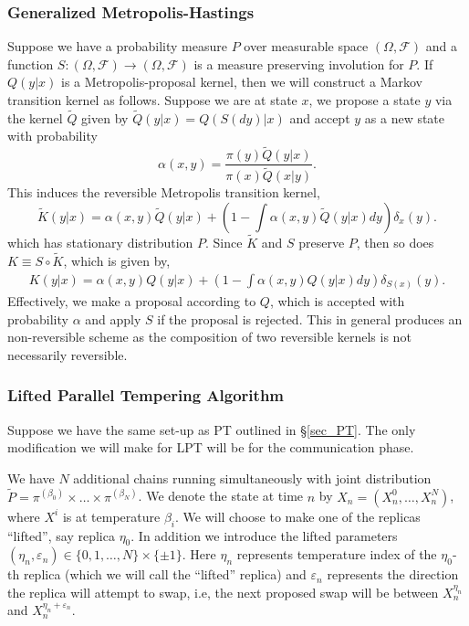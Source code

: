 \documentclass[12pt]{article}
\newcommand{\eps}{\varepsilon}
\begin{document}
\subsubsection{Generalized Metropolis-Hastings}\label{sec_GMH}
Suppose we have a probability measure $P$ over measurable space $(\Omega,\mathcal{F})$ and a function $S:(\Omega,\mathcal{F})\to (\Omega,\mathcal{F})$ is a measure preserving involution for $P$. If $Q(y|x)$ is a Metropolis-proposal kernel, then we will construct a Markov transition kernel as follows. Suppose we are at state $x$, we propose a state $y$ via the kernel $\tilde{Q}$ given by $\tilde{Q}(y|x)=Q(S(dy)|x)$ and accept $y$ as a new state with probability 
\[\alpha(x,y)=\frac{\pi(y)\tilde{Q}(y|x)}{\pi(x)\tilde{Q}(x|y)}.\]
This induces the reversible Metropolis transition kernel, 
\[\tilde{K}(y|x)=\alpha(x,y)\tilde{Q}(y|x)+\left(1-\int\alpha(x,y)\tilde{Q}(y|x)dy\right)\delta_x(y).\]
which has stationary distribution $P$. Since $\tilde{K}$ and $S$ preserve $P$, then so does $K\equiv S\circ \tilde{K}$, which is given by,
\begin{align*}
K(y|x)=\alpha(x,y)Q(y|x)+\left(1-\int\alpha(x,y)Q(y|x)dy\right)\delta_{S(x)}(y).
\end{align*}
Effectively, we make a proposal according to $Q$, which is accepted with probability $\alpha$ and apply $S$ if the proposal is rejected. This in general produces an non-reversible scheme as the composition of two reversible kernels is not necessarily reversible.
\subsubsection{Lifted Parallel Tempering Algorithm}
Suppose we have the same set-up as PT outlined in \S\ref{sec_PT}. The only modification we will make for LPT will be for the communication phase.

We have $N$ additional chains running simultaneously with joint distribution $\tilde{P}=\pi^{(\beta_0)}\times\dots\times\pi^{(\beta_N)}$. We denote the state at time $n$ by $X_n=(X^0_n,\dots, X^N_n)$, where $X^i$ is at temperature $\beta_i$. We will choose to make one of the replicas ``lifted'', say replica $\eta_0$.  In addition we introduce the lifted parameters $(\eta_n,\varepsilon_n)\in \{0,1,\dots,N\}\times\{\pm 1\}$. Here $\eta_n$ represents temperature index of the $\eta_0$-th replica (which we will call the ``lifted'' replica) and $\varepsilon_n$ represents the direction the replica will attempt to swap, i.e, the next proposed swap will be between $X^{\eta_n}_n$ and $X^{\eta_n+\eps_n}_n$. 
\end{document}
